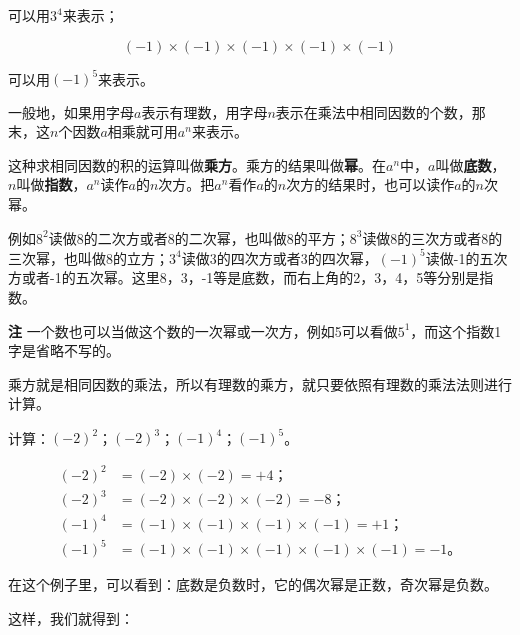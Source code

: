 可以用\(3^{4}\)来表示；

\[
(- 1) \times (- 1) \times (- 1) \times (- 1) \times (- 1)
\]

可以用\((-1)^{5}\)来表示。

一般地，如果用字母\(a\)表示有理数，用字母\(n\)表示在乘法中相同因数的个数，那末，这\(n\)个因数\(a\)相乘就可用\(a^n\)来表示。

这种求相同因数的积的运算叫做\textbf{乘方}。乘方的结果叫做\textbf{幂}。在\(a^n\)中，\(a\)叫做\textbf{底数}，\(n\)叫做\textbf{指数}，\(a^n\)读作\(a\)的\(n\)次方。把\(a^n\)看作\(a\)的\(n\)次方的结果时，也可以读作\(a\)的\(n\)次幂。

例如\(8^{2}\)读做8的二次方或者8的二次幂，也叫做8的平方；\(8^{3}\)读做8的三次方或者8的三次幂，也叫做8的立方；\(3^{4}\)读做3的四次方或者3的四次幂，\((-1)^{5}\)读做-1的五次方或者-1的五次幂。这里8，3，-1等是底数，而右上角的2，3，4，5等分别是指数。

\textbf{注} 一个数也可以当做这个数的一次幂或一次方，例如5可以看做\(5^{1}\)，而这个指数1字是省略不写的。

乘方就是相同因数的乘法，所以有理数的乘方，就只要依照有理数的乘法法则进行计算。

 计算：\((-2)^2\)；\((-2)^3\)；\((-1)^4\)；\((-1)^5\)。

\begin{align*}
(-2)^2 &= (-2) \times (-2) = +4； \\
(-2)^3 &= (-2) \times (-2) \times (-2) = -8； \\
(-1)^4 &= (-1) \times (-1) \times (-1) \times (-1) = +1； \\
(-1)^5 &= (-1) \times (-1) \times (-1) \times (-1) \times (-1) = -1。
\end{align*}

在这个例子里，可以看到：底数是负数时，它的偶次幂是正数，奇次幂是负数。

这样，我们就得到：

\begin{center}
\end{center}

